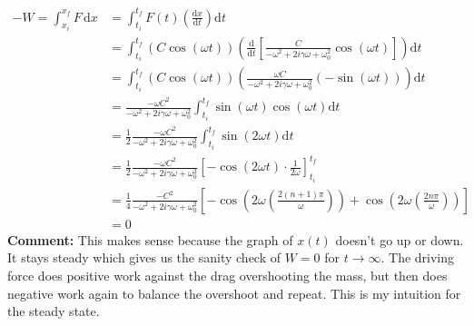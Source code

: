 \documentclass[12pt,letter]{article}
\begin{document}
{\begin{align*}
	-W = \int_{x_i}^{x_f} F \, \mathrm{d} x &= \int_{t_i}^{t_f}   F(t) 
	\left(\frac{\mathrm{d} x}{\mathrm{d} t}\right)\mathrm{d}  t \\
	&= \int_{t_i}^{t_f} (C \cos(\omega t) ) 
	\left( \frac{\mathrm{d} }{\mathrm{d} t} 
		\left[ \frac{C}{- \omega^2 + 2 i \gamma \omega + \omega_0^2 } \cos (\omega t) \right] 
	\right) \mathrm{d} t \\ 
	&= \int_{t_i}^{t_f} (C \cos( \omega t) ) 
	\left(
\frac{ \omega C}{- \omega^2 + 2 i \gamma \omega + \omega_0^2 } (- \sin (\omega t )) 
	\right) \mathrm{d} t\\ 
	&= \frac{- \omega C^2 }{ - \omega^2 + 2 i \gamma \omega + \omega_0^2 } \int_{t_i}^{t_f}  \sin(\omega t) \cos (\omega t ) \mathrm{d}  t \\
	&=  \frac{1}{2 } \frac{- \omega C^2 }{ - \omega^2 + 2 i \gamma \omega + \omega_0^2 } \int_{t_i}^{t_f}  \sin ( 2 \omega t  ) \mathrm{d}  t \\
	&=  \frac{1}{2 } \frac{- \omega C^2 }{ - \omega^2 + 2 i \gamma \omega + \omega_0^2 } 
	\left[ - \cos(2 \omega t) \cdot  \frac{1}{2 \omega} \right]_{t_i}^{t_f}  \\
	&=  \frac{1}{4 } \frac{- C^2 }{ - \omega^2 + 2 i \gamma \omega + \omega_0^2 } 
\left[ - \cos\left(2 \omega \left( \frac{2(n+1)\pi}{\omega} \right)\right) + \cos 
\left(
2 \omega \left( \frac{2 n \pi }{\omega }\right)
\right)\right]  \\ 
	&= 0 
\end{align*}
\textbf{Comment:} This makes sense because the graph of $x(t)$ doesn't go up or down. It stays steady which gives us the sanity check of $W = 0$ for $t \to  \infty$. The driving force does positive work against the drag overshooting the mass, but then does negative work again to balance the overshoot and repeat. This is my intuition for the steady state. 

}
\end{document}
